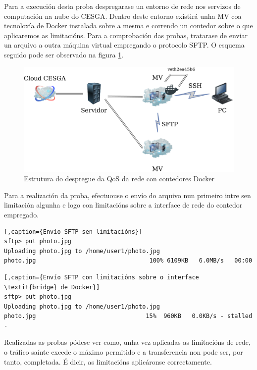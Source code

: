 Para a execución desta proba despregarase un entorno de rede nos servizos de computación na nube do \gls{CESGA}. Dentro deste entorno existirá unha \gls{MV} coa tecnoloxía de Docker instalada sobre a mesma e correndo un contedor sobre o que aplicaremos as limitacións. Para a comprobación das probas, tratarase de enviar un arquivo a outra máquina virtual empregando o protocolo \gls{SFTP}. O esquema seguido pode ser observado na figura \ref{DiagramaQoSRedeDocker}.\\

\begin{figure}
\centerline{\includegraphics[width=15cm]{figuras/DiagramaQoSRedeDocker.png}}
\caption{Estrutura do despregue da QoS da rede con contedores Docker}
\label{DiagramaQoSRedeDocker}
\end{figure}

Para a realización da proba, efectuouse o envío do arquivo nun primeiro intre sen limitación algunha e logo con limitacións sobre a interface de rede do contedor empregado.\\

\begin{lstlisting}[,caption={Envío SFTP sen limitacións}]
sftp> put photo.jpg 
Uploading photo.jpg to /home/user1/photo.jpg
photo.jpg                                100% 6109KB   6.0MB/s   00:00 
\end{lstlisting}

\begin{lstlisting}[,caption={Envío SFTP con limitacións sobre o interface \textit{bridge} de Docker}]
sftp> put photo.jpg
Uploading photo.jpg to /home/user1/photo.jpg
photo.jpg                               15%  960KB   0.0KB/s - stalled -
\end{lstlisting}

Realizadas as probas pódese ver como, unha vez aplicadas as limitacións de rede, o tráfico saínte excede o máximo permitido e a transferencia non pode ser, por tanto, completada. É dicir, as limitacións aplicáronse correctamente.

